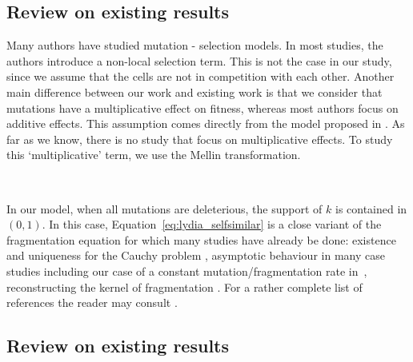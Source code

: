 \subsection{Review on existing results}%
Many authors have studied mutation - selection models. 
In most studies, the authors introduce a non-local selection term. This is not the case in our study, since we assume that the cells are not in competition with each other. 
Another main difference between our work and existing work is that we consider that mutations have a multiplicative effect on fitness, whereas most authors focus on additive effects. This assumption comes directly from the model proposed in \cite{robert2018mutation}. %
As far as we know, there is no study that focus on multiplicative effects. To study this ‘multiplicative’ term, we use the Mellin transformation. 

\ 

{\MD In our model,}
when all mutations are deleterious, the support of $k$ is contained in $(0,1)$. In this case, Equation~\eqref{eq:lydia_selfsimilar} is a {\MD close variant} of the fragmentation equation for which many studies have already be done: existence and uniqueness for the Cauchy problem \cite{melzak1957scalar}, asymptotic behaviour {\MD in many case studies including our case of a constant mutation/fragmentation rate in}~\cite{doumic2016time}, reconstructing the kernel of fragmentation \cite{hoang2017estimating,hoang2017nonparametric, doumic2018estimating,doumic2021inverse}. %
For a rather complete list of references the reader may consult \cite{banasiak2019analytic}.\\
\subsection{Review on existing results} \mbox{}



